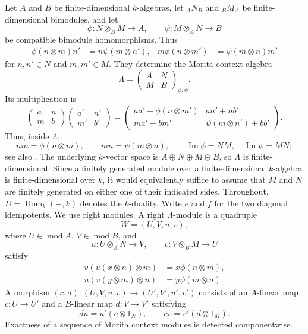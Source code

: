 \documentclass[11pt,reqno]{amsart}
\theoremstyle{definition}
\theoremstyle{remark}
\newcommand{\modu}{\operatorname{mod}}
\newcommand{\Hom}{\operatorname{Hom}}
\numberwithin{equation}{section}
\begin{document}
Let $A$ and $B$ be finite-dimensional $k$-algebras,
let ${}_AN_B$ and ${}_BM_A$ be finite-dimensional bimodules, and let
\[
 \phi:N\otimes_BM\longrightarrow A,
 \qquad
 \psi:M\otimes_AN\longrightarrow B
\]
be compatible bimodule homomorphisms.  Thus
\begin{align}
 \phi(n\otimes m)n'&=n\psi(m\otimes n'),
 &m\phi(n\otimes m')&=\psi(m\otimes n)m'
 \label{eq:context-identities}
\end{align}
for $n,n'\in N$ and $m,m'\in M$.  They determine the Morita context algebra
\[
 \Lambda=
 \begin{pmatrix}A&N\\M&B\end{pmatrix}_{\phi,\psi}.
\]
Its multiplication is
\[
 \begin{pmatrix}a&n\\m&b\end{pmatrix}
 \begin{pmatrix}a'&n'\\m'&b'\end{pmatrix}
 =
 \begin{pmatrix}
  aa'+\phi(n\otimes m')&an'+nb'\\
  ma'+bm'&\psi(m\otimes n')+bb'
 \end{pmatrix}.
\]
Thus, inside $\Lambda$,
\[
 nm=\phi(n\otimes m),\qquad mn=\psi(m\otimes n),
 \qquad
 \operatorname{Im}\phi=NM,\quad \operatorname{Im}\psi=MN;
\]
see also \cite[Section~2]{GreenPsaroudakis}.  The underlying $k$-vector
space is $A\oplus N\oplus M\oplus B$, so $\Lambda$ is finite-dimensional.
Since a finitely generated module over a finite-dimensional $k$-algebra is
finite-dimensional over $k$, it would equivalently suffice to assume that
$M$ and $N$ are finitely generated on either one of their indicated sides.
Throughout, $D=\Hom_k(-,k)$ denotes the $k$-duality.
Write $e$ and $f$ for the two diagonal idempotents.  We use right modules.
A right $\Lambda$-module is a quadruple
\[
 W=(U,V,u,v),
\]
where $U\in\modu A$, $V\in\modu B$, and
\[
 u:U\otimes_AN\longrightarrow V,
 \qquad
 v:V\otimes_BM\longrightarrow U
\]
satisfy
\begin{align}
 v(u(x\otimes n)\otimes m)&=x\phi(n\otimes m),
 \label{eq:module-one}\\
 u(v(y\otimes m)\otimes n)&=y\psi(m\otimes n).
 \label{eq:module-two}
\end{align}
A morphism $(c,d):(U,V,u,v)\to(U',V',u',v')$ consists of an
$A$-linear map $c:U\to U'$ and a $B$-linear map $d:V\to V'$ satisfying
\[
 du=u'(c\otimes1_N),\qquad cv=v'(d\otimes1_M).
\]
Exactness of a sequence of Morita context modules is detected componentwise.
\end{document}
